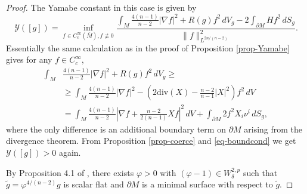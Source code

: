 \documentclass[a4paper,11pt,reqno]{amsart}
\theoremstyle{plain}
\theoremstyle{definition}
\theoremstyle{remark}
\numberwithin{equation}{section}
\begin{document}
\begin{proof}
	The Yamabe constant in this case is given by \cite{Maxwell2005ApparentHorizonBoundaries}
	\begin{equation}
		\mathcal Y([g])=\inf_{f\in C^\infty_c(\overline M),f\not\equiv0}\frac{\int_M \frac{4(n-1)}{n-2}|\nabla f|^2+R(g)f^2\,dV_g-2\int_{\partial M}Hf^2\,dS_g}{\|f\|^2_{L^{2n/(n-2)}}}.
	\end{equation}
	Essentially the same calculation as in the proof of Proposition \ref{prop-Yamabe} gives for any $f\in C^\infty_c$,
	\begin{align*}
		\int_M &\frac{4(n-1)}{n-2}|\nabla f|^2+R(g)f^2\,dV_g\geq \\ &\geq \int_M \frac{4(n-1)}{n-2}|\nabla f|^2-\left( 2\mathrm{div}(X)-\frac{n-2}{n-1}|X|^2 \right)f^2\,dV\\&=\int_M \frac{4(n-1)}{n-2}\left|\nabla f +\frac{n-2}{2(n-1)}Xf   \right|^2\,dV+\int_{\partial M} 2f^2X_i\nu^i\,dS_g,
	\end{align*}
	where the only difference is an additional boundary term on $\partial M$ arising from the divergence theorem. From Proposition \ref{prop-coerce} and \eqref{eq-boundcond} we get $\mathcal Y([g])>0$ again.
	
	By Proposition 4.1 of \cite{Maxwell2005ApparentHorizonBoundaries}, there exists $\varphi>0$ with $(\varphi-1)\in W^{2,p}_\delta$ such that $\widetilde g=\varphi^{4/(n-2)}g$ is scalar flat and $\partial M$ is a minimal surface with respect to $\widetilde g$.
	

\end{proof}
\end{document}
